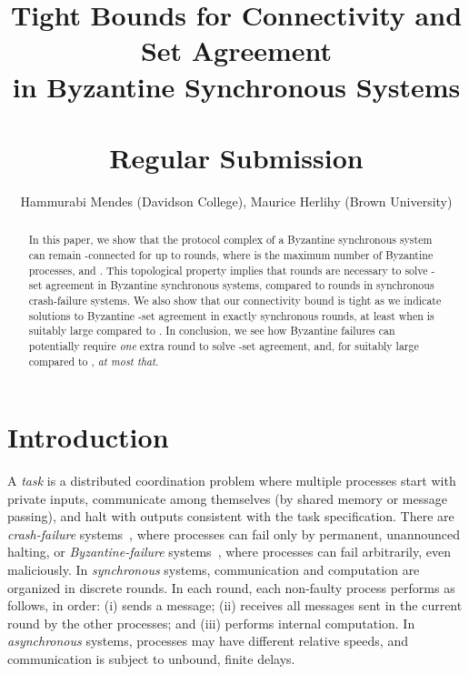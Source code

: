 \documentclass[11pt]{article}
\title{Tight Bounds for Connectivity and Set Agreement\\in Byzantine Synchronous Systems\\
~\\
{\large Regular Submission}}
\author{Hammurabi Mendes (Davidson College), Maurice Herlihy (Brown University)}
\date{}
\begin{document}
\maketitle

\begin{abstract}
In this paper,
we show that the protocol complex of a Byzantine synchronous system
can remain -connected for up to  rounds,
where  is the maximum number of Byzantine processes,
and .
This topological property implies that
 rounds are necessary to solve -set agreement
in Byzantine synchronous systems,
compared to   rounds in synchronous crash-failure systems.
We also show that our connectivity bound is tight
as we indicate solutions to Byzantine -set agreement in exactly
 synchronous rounds,
at least when  is suitably large compared to .
In conclusion,
we see how Byzantine failures can potentially require \emph{one} extra round
to solve -set agreement, and,
for  suitably large compared to , \emph{at most that}.
\end{abstract}

\section{Introduction}
\label{Sec-Introduction}

A \emph{task} is a distributed coordination problem
where multiple processes start with private inputs,
communicate among themselves (by shared memory or message passing),
and halt with outputs consistent with the task specification.
There are \emph{crash-failure} systems~\cite{DSBook},
where processes can fail only by permanent, unannounced halting,
or \emph{Byzantine-failure} systems~\cite{Lamport1982},
where processes can fail arbitrarily, even maliciously.
In \emph{synchronous} systems,
communication and computation are organized in discrete rounds.
In each round, each non-faulty process performs as follows, in order: (i) sends a message;
(ii) receives all messages sent in the current round by the other processes;
and (iii) performs internal computation.
In \emph{asynchronous} systems,
processes may have different relative speeds,
and communication is subject to unbound, finite delays.
\end{document}
